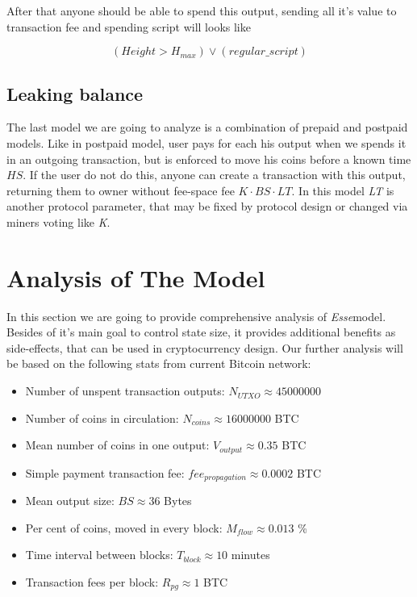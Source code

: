 \documentclass[]{article}   %
\newcommand{\esse}{\textit{Esse}}
\begin{document}
After that anyone should be able to spend this output, sending all it's value to transaction fee and spending script will looks like

\begin{equation}
(Height > H_{max}) \lor (regular\_script)
\end{equation}

\subsection{Leaking balance}

The last model we are going to analyze is a combination of prepaid and postpaid models. Like in postpaid model, user pays for each his output when we spends it in an outgoing transaction, but is enforced to move his coins before a known time \textit{$HS$}. If the user do not do this, anyone can create a transaction with this output, returning them to owner without fee-space fee ${K \cdot BS \cdot LT}$. In this model \textit{LT} is another protocol parameter, that may be fixed by protocol design or changed via miners voting like \textit{K}.

\section{Analysis of The Model}
\label{sec:analysis}

In this section we are going to provide comprehensive analysis of \esse model. Besides of it's main goal to control state size, it provides additional benefits as side-effects, that can be used in cryptocurrency design. Our further analysis will be based on the following stats from current Bitcoin network:

\begin{itemize}
  \item Number of unspent transaction outputs: $N_{UTXO} \approx 45000000$
  \item Number of coins in circulation: $N_{coins} \approx 16000000$ BTC
  \item Mean number of coins in one output: $V_{output} \approx 0.35$ BTC
  \item Simple payment transaction fee: $fee_{propagation} \approx 0.0002$ BTC
  \item Mean output size: $BS \approx 36$ Bytes
  \item Per cent of coins, moved in every block: $M_{flow} \approx 0.013$ \%
  \item Time interval between blocks: $T_{block} \approx 10$ minutes
  \item Transaction fees per block: $R_{pg} \approx 1$ BTC
\end{itemize}
\end{document}
